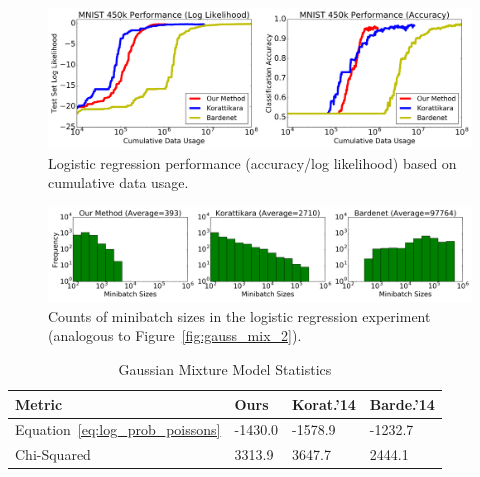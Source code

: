 \documentclass{article}
\begin{document}
\begin{figure}[t]
	\centering
	\includegraphics[width=0.9\linewidth]{logistic_regression_ll_acc_results.png}
	\caption{
    Logistic regression performance (accuracy/log likelihood) based on
    cumulative data usage.
    }
	\label{fig:logistic_performance}
\end{figure}
\begin{figure}[t]
	\centering
	\includegraphics[width=0.9\linewidth]{logistic_regression_histograms_results.png}
	\caption{
    Counts of minibatch sizes in the logistic regression experiment (analogous
    to Figure~\ref{fig:gauss_mix_2}).
    }
	\label{fig:logistic_minibatch}
\end{figure}



\begin{table}[t]
    \caption{Gaussian Mixture Model Statistics}
    \label{tab:poissons}
    \centering
    \begin{tabular}{l l l l} \\
    {\bf Metric} & {\bf Ours} & {\bf Korat.'14} & {\bf Barde.'14} \\
    \hline
    Equation~\ref{eq:log_prob_poissons} & -1430.0 & -1578.9 & -1232.7 \\
    Chi-Squared & 3313.9 & 3647.7 & 2444.1
    \end{tabular}
\end{table}
\end{document}
